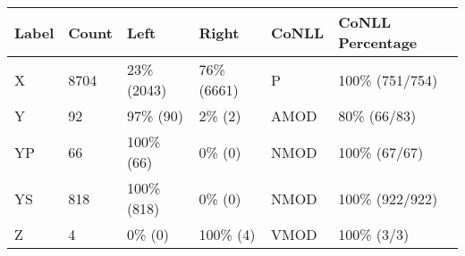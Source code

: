 \begin{figure*}
\begin{tabular}{|l|l|l|l||l|l|}
\hline
Label & Count & Left & Right & CoNLL & CoNLL Percentage\\ 
\hline
 X & 8704 & 23\% (2043) & 76\% (6661) & P & 100\% (751/754) \\ 
\hline
 Y & 92 & 97\% (90) & 2\% (2) & AMOD & 80\% (66/83) \\ 
\hline
 YP & 66 & 100\% (66) & 0\% (0) & NMOD & 100\% (67/67) \\ 
\hline
 YS & 818 & 100\% (818) & 0\% (0) & NMOD & 100\% (922/922) \\ 
\hline
 Z & 4 & 0\% (0) & 100\% (4) & VMOD & 100\% (3/3) \\ 
\hline
\end{tabular}
\end{figure*}
